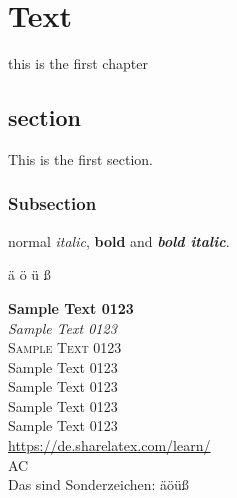 \chapter{Text}

this is the first chapter

\section{section}

This is the first section.

\subsection{Subsection}

normal \emph{italic}, \textbf{bold} and \textbf{\emph{bold italic}}.

ä ö ü ß


{\textbf{Sample Text 0123}}
\\ %
{\textit{Sample Text 0123}}
\\ %
{\textsc{Sample Text 0123}}
\\ %
{\textsf{Sample Text 0123}}
\\ %
{\tiny{Sample Text 0123}}
\\ %
{\normalsize{Sample Text 0123}}
\\ %
{\huge{Sample Text 0123}}
\\ %
{\color{HyperlinkBlue}\url{https://de.sharelatex.com/learn/}}
\\
AC
\\
Das sind Sonderzeichen: äöüß
